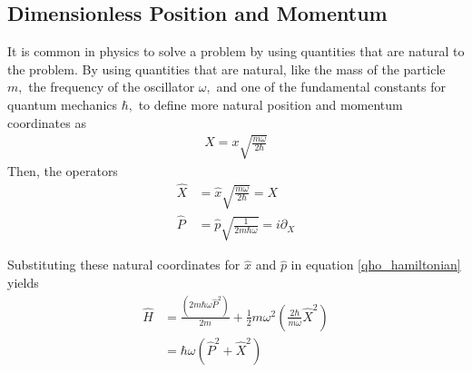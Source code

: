 \subsection{Dimensionless Position and Momentum}

It is common in physics to solve a problem by using quantities that are natural to the problem. By using quantities that are natural, like the mass of the particle \(m,\) the frequency of the oscillator \(\omega,\) and one of the fundamental constants for quantum mechanics \(\hbar,\) to define more natural position and momentum coordinates as
\begin{align}
    X=x\sqrt{\frac{m\omega}{2\hbar}}
\end{align}
Then, the operators
\begin{align}
    \hat X &= \hat x\sqrt{\frac{m\omega}{2\hbar}}=X\\
    \hat P &= \hat p\sqrt{\frac{1}{2m\hbar\omega}}=i\partial_X
\end{align}

Substituting these natural coordinates for \(\hat x\) and \(\hat p\) in equation \eqref{qho_hamiltonian} yields
\begin{align}
    \hat H&=\frac{\left(2m\hbar\omega\hat P^2\right)}{2m}+\frac{1}{2}m\omega^2 \left(\frac{2\hbar}{m\omega}\hat X^2\right)\\
    &=\hbar\omega\left(\hat P^2+\hat X^2\right)
\end{align}
